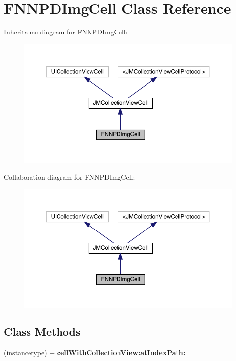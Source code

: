 \hypertarget{interface_f_n_n_p_d_img_cell}{}\section{F\+N\+N\+P\+D\+Img\+Cell Class Reference}
\label{interface_f_n_n_p_d_img_cell}


Inheritance diagram for F\+N\+N\+P\+D\+Img\+Cell\+:\nopagebreak
\begin{figure}[H]
\begin{center}
\leavevmode
\includegraphics[width=350pt]{interface_f_n_n_p_d_img_cell__inherit__graph}
\end{center}
\end{figure}


Collaboration diagram for F\+N\+N\+P\+D\+Img\+Cell\+:\nopagebreak
\begin{figure}[H]
\begin{center}
\leavevmode
\includegraphics[width=350pt]{interface_f_n_n_p_d_img_cell__coll__graph}
\end{center}
\end{figure}
\subsection*{Class Methods}
\begin{DoxyCompactItemize}
\item 
\mbox{\label{interface_f_n_n_p_d_img_cell_a013eeed3c5198f43a2cb694e8c6cfc0b}} 
(instancetype) + {\bfseries cell\+With\+Collection\+View\+:at\+Index\+Path\+:}
\end{DoxyCompactItemize}
